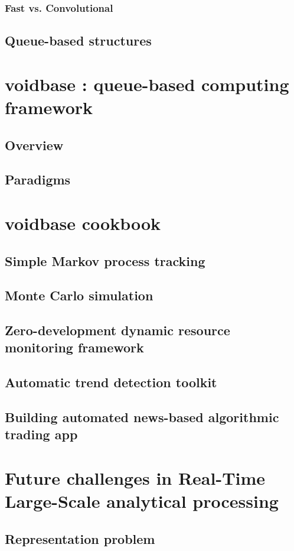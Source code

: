 \documentclass[]{book}    %
\begin{document}
\subsection{Fast vs. Convolutional}
\section{Queue-based structures}

\chapter{voidbase : queue-based computing framework}
\section{Overview}
\section{Paradigms}

\chapter{voidbase cookbook}

\section{Simple Markov process tracking}
\section{Monte Carlo simulation}
\section{Zero-development dynamic resource monitoring framework}
\section{Automatic trend detection toolkit}
\section{Building automated news-based algorithmic trading app}

\chapter{Future challenges in Real-Time Large-Scale analytical processing}
\section{Representation problem}
\end{document}

